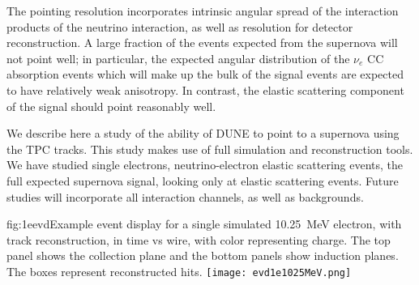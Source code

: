The pointing resolution incorporates intrinsic angular spread of the interaction products of the neutrino interaction, as well as resolution for detector reconstruction.  A large fraction of the events expected from the supernova will not point well; in particular, the expected angular distribution of the $\nu_e$ CC absorption events which will make up the bulk of the signal events are expected to have relatively weak anisotropy.  In contrast, the elastic scattering component of the signal should point reasonably well.

We describe here a study of the ability of DUNE to point to a
supernova using the TPC tracks.  This study makes use of full 
simulation and reconstruction tools.
We have studied single electrons, neutrino-electron elastic scattering
events, the full expected supernova signal, looking only at elastic
scattering events.  Future studies will incorporate all interaction
channels, as well as backgrounds.


\begin{dunefigure}[ES event]{fig:1eevd}{Example event display for a
    single simulated 10.25~MeV electron, with track reconstruction, in
    time vs wire, with color representing charge.
    The top panel shows the collection plane and the bottom panels
    show induction planes.  The boxes represent reconstructed hits. }
 \texttt{[image: evd1e1025MeV.png]}
\end{dunefigure}




